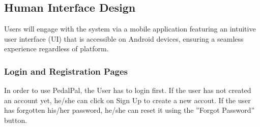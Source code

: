 \subsection{Human Interface Design}
Users will engage with the system via a mobile application featuring an intuitive user interface (UI) that is accessible on Android devices, ensuring a seamless experience regardless of platform.
\subsubsection{Login and Registration Pages}
In order to use PedalPal, the User has to login first. If the user has not created an account yet, he/she can click on Sign Up to create a new accout. If the user has forgotten his/her password, he/she can reset it using the ”Forgot Password” button.
\begin{center}
\begin{tabular}{ccc}

\end{tabular}
\end{center}
